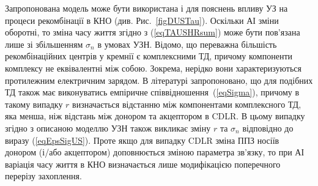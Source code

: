 Запропонована модель може бути використана і для пояснень впливу УЗ на процеси рекомбінації в КНО (див. Рис.~\ref{figDUSTau}).
Оскільки АІ зміни оборотні, то зміна часу життя згідно з (\ref{eqTAUSHRsum}) може бути пов'язана лише зі збільшенням
$\sigma_n$ в умовах УЗН.
Відомо, що переважна більшість рекомбінаційних центрів у кремнії є комплексними ТД,
причому компоненти комплексу не еквівалентні між собою.
Зокрема, нерідко вони характеризуються протилежним електричним зарядом.
В літературі \cite{CDLR:R2} запропоновано, що для подібних ТД також має виконуватись емпіричне співвідношення~(\ref{eqSigma}),
причому в такому випадку $r$ визначається відстанню між компонентами комплексного ТД, яка  менша, ніж відстань між донором та акцептором в CDLR.
В цьому випадку згідно з описаною моделлю УЗН також викликає зміну $r$ та $\sigma_n$ відповідно до виразу (\ref{eqEpsSigUS}).
Проте якщо для випадку CDLR зміна ППЗ носіїв донором (і/або акцептором) доповнюється зміною параметра зв'язку,
то при АІ варіація часу життя в КНО визначається лише модифікацією поперечного перерізу захоплення.

